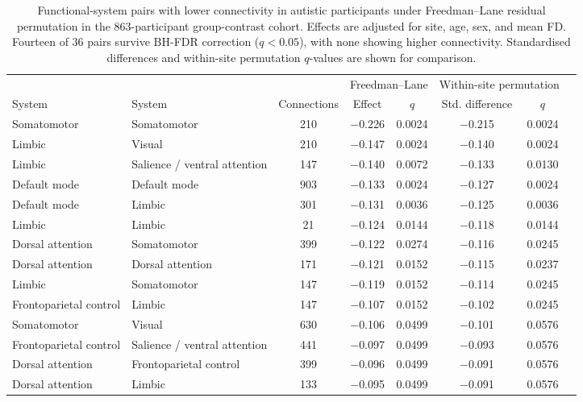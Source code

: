 \begin{table}[t]
\centering
\caption{Functional-system pairs with lower connectivity in autistic participants under Freedman--Lane residual permutation in the 863-participant group-contrast cohort. Effects are adjusted for site, age, sex, and mean FD. Fourteen of 36 pairs survive BH-FDR correction ($q<0.05$), with none showing higher connectivity. Standardised differences and within-site permutation $q$-values are shown for comparison.}
\label{tab:system-pairs}
\footnotesize
\setlength{\tabcolsep}{3pt}
\begin{tabular}{@{}llcccccc@{}}
\toprule
 & & & \multicolumn{2}{c}{Freedman--Lane} & \multicolumn{2}{c}{Within-site permutation} \\
\cmidrule(lr){4-5}\cmidrule(l){6-7}
System & System & Connections & Effect & $q$ & Std. difference & $q$ \\
\midrule
Somatomotor & Somatomotor & 210 & $-$0.226 & 0.0024 & $-$0.215 & 0.0024 \\
Limbic & Visual & 210 & $-$0.147 & 0.0024 & $-$0.140 & 0.0024 \\
Limbic & Salience / ventral attention & 147 & $-$0.140 & 0.0072 & $-$0.133 & 0.0130 \\
Default mode & Default mode & 903 & $-$0.133 & 0.0024 & $-$0.127 & 0.0024 \\
Default mode & Limbic & 301 & $-$0.131 & 0.0036 & $-$0.125 & 0.0036 \\
Limbic & Limbic & 21 & $-$0.124 & 0.0144 & $-$0.118 & 0.0144 \\
Dorsal attention & Somatomotor & 399 & $-$0.122 & 0.0274 & $-$0.116 & 0.0245 \\
Dorsal attention & Dorsal attention & 171 & $-$0.121 & 0.0152 & $-$0.115 & 0.0237 \\
Limbic & Somatomotor & 147 & $-$0.119 & 0.0152 & $-$0.114 & 0.0245 \\
Frontoparietal control & Limbic & 147 & $-$0.107 & 0.0152 & $-$0.102 & 0.0245 \\
Somatomotor & Visual & 630 & $-$0.106 & 0.0499 & $-$0.101 & 0.0576 \\
Frontoparietal control & Salience / ventral attention & 441 & $-$0.097 & 0.0499 & $-$0.093 & 0.0576 \\
Dorsal attention & Frontoparietal control & 399 & $-$0.096 & 0.0499 & $-$0.091 & 0.0576 \\
Dorsal attention & Limbic & 133 & $-$0.095 & 0.0499 & $-$0.091 & 0.0576 \\
\bottomrule
\end{tabular}
\end{table}

